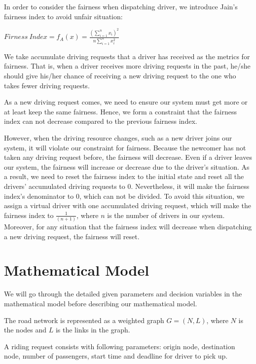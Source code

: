 In order to consider the fairness when dispatching driver, we introduce Jain's fairness index to avoid unfair situation:

$Firness\ Index = f_A(x) = \frac{\left(\sum\limits_{i=1}^{n} x_i\right)^2}{n \sum\limits_{i=1}^{n} x_i^2}$

We take accumulate driving requests that a driver has received as the metrics for fairness. That is, when a driver receives more driving requests in the past, he/she should give his/her chance of receiving a new driving request to the one who takes fewer driving requests.

As a new driving request comes, we need to ensure our system must get more or at least keep the same fairness. Hence, we form a constraint that the fairness index can not decrease compared to the previous fairness index.

However, when the driving resource changes, such as a new driver joins our system, it will violate our constraint for fairness. Because the newcomer has not taken any driving request before, the fairness will decrease. Even if a driver leaves our system, the fairness will increase or decrease due to the driver's situation. As a result, we need to reset the fairness index to the initial state and reset all the drivers' accumulated driving requests to 0. Nevertheless, it will make the fairness index's denominator to 0, which can not be divided. To avoid this situation, we assign a virtual driver with one accumulated driving request, which will make the fairness index to $\frac{1}{(n+1)}$, where $n$ is the number of drivers in our system. Moreover, for any situation that the fairness index will decrease when dispatching a new driving request, the fairness will reset.

\newpage

\section{Mathematical Model}

We will go through the detailed given parameters and decision variables in the mathematical model before describing our mathematical model.

The road network is represented as a weighted graph $G = (N, L)$, where $N$ is the nodes and $L$ is the links in the graph.

A riding request consists with following parameters: origin node, destination node, number of passengers, start time and deadline for driver to pick up.

